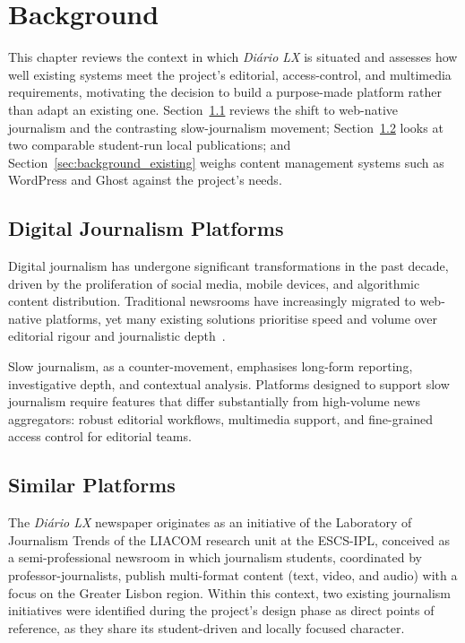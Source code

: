 %
%
\chapter{Background} \label{cap:background}

This chapter reviews the context in which \textit{Diário LX} is situated and assesses how well
existing systems meet the project's editorial, access-control, and multimedia requirements,
motivating the decision to build a purpose-made platform rather than adapt an existing one.
Section~\ref{sec:background_journalism} reviews the shift to web-native journalism and the
contrasting slow-journalism movement; Section~\ref{sec:background_comparable} looks at two
comparable student-run local publications; and Section~\ref{sec:background_existing} weighs
content management systems such as WordPress and Ghost against the project's needs.

\section{Digital Journalism Platforms} \label{sec:background_journalism}

Digital journalism has undergone significant transformations in the past decade, driven
by the proliferation of social media, mobile devices, and algorithmic content
distribution. Traditional newsrooms have increasingly migrated to web-native platforms,
yet many existing solutions prioritise speed and volume over editorial rigour and
journalistic depth~\cite{slow_journalism}.

Slow journalism, as a counter-movement, emphasises long-form reporting, investigative
depth, and contextual analysis. Platforms designed to support slow journalism require
features that differ substantially from high-volume news aggregators: robust editorial
workflows, multimedia support, and fine-grained access control for editorial teams.

\section{Similar Platforms} \label{sec:background_comparable}

The \textit{Diário LX} newspaper originates as an initiative of the Laboratory of
Journalism Trends of the LIACOM research unit at the ESCS-IPL, conceived as a
semi-professional newsroom in which journalism students, coordinated by
professor-journalists, publish multi-format content (text, video, and audio) with a
focus on the Greater Lisbon region. Within this context, two existing journalism
initiatives were identified during the project's design phase as direct points of
reference, as they share its student-driven and locally focused character.


